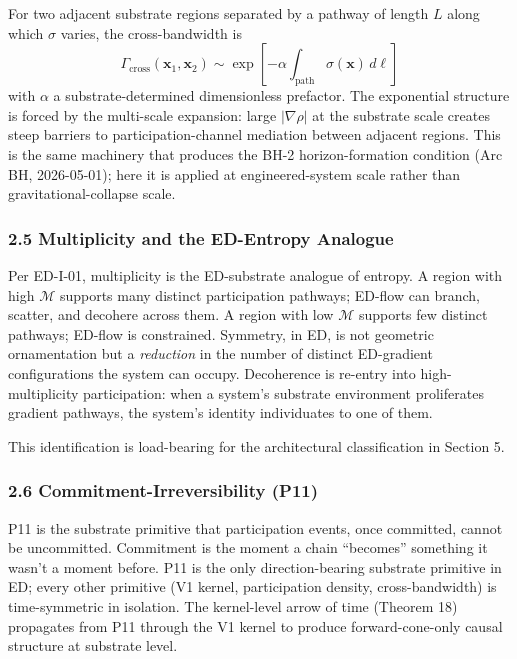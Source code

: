 \documentclass[
  11pt,
  a4paper,
]{article}
\begin{document}
For two adjacent substrate regions separated by a pathway of length
\(L\) along which \(\sigma\) varies, the cross-bandwidth is \[
\Gamma_{\mathrm{cross}}(\mathbf{x}_1, \mathbf{x}_2) \sim \exp\!\left[-\alpha\!\int_{\mathrm{path}}\sigma(\mathbf{x})\,d\ell\right]
\] with \(\alpha\) a substrate-determined dimensionless prefactor. The
exponential structure is forced by the multi-scale expansion: large
\(|\nabla\rho|\) at the substrate scale creates steep barriers to
participation-channel mediation between adjacent regions. This is the
same machinery that produces the BH-2 horizon-formation condition (Arc
BH, 2026-05-01); here it is applied at engineered-system scale rather
than gravitational-collapse scale.

\subsubsection{2.5 Multiplicity and the ED-Entropy
Analogue}\label{multiplicity-and-the-ed-entropy-analogue}

Per ED-I-01, multiplicity is the ED-substrate analogue of entropy. A
region with high \(\mathcal{M}\) supports many distinct participation
pathways; ED-flow can branch, scatter, and decohere across them. A
region with low \(\mathcal{M}\) supports few distinct pathways; ED-flow
is constrained. Symmetry, in ED, is not geometric ornamentation but a
\emph{reduction} in the number of distinct ED-gradient configurations
the system can occupy. Decoherence is re-entry into high-multiplicity
participation: when a system's substrate environment proliferates
gradient pathways, the system's identity individuates to one of them.

This identification is load-bearing for the architectural classification
in Section 5.

\subsubsection{2.6 Commitment-Irreversibility
(P11)}\label{commitment-irreversibility-p11}

P11 is the substrate primitive that participation events, once
committed, cannot be uncommitted. Commitment is the moment a chain
``becomes'' something it wasn't a moment before. P11 is the only
direction-bearing substrate primitive in ED; every other primitive (V1
kernel, participation density, cross-bandwidth) is time-symmetric in
isolation. The kernel-level arrow of time (Theorem 18) propagates from
P11 through the V1 kernel to produce forward-cone-only causal structure
at substrate level.
\end{document}
